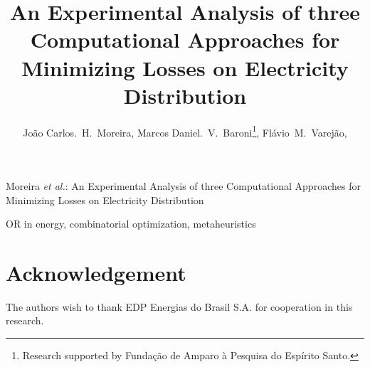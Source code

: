 \documentclass{IEEEtran}
\begin{document}
\title{An Experimental Analysis of three Computational Approaches for Minimizing Losses on Electricity Distribution}

\author{Jo\~ao Carlos.~H.~Moreira,
	Marcos Daniel.~V.~Baroni\thanks{Research supported by Funda\c c\~ao de Amparo \`a Pesquisa do Esp\'irito Santo.},
	Fl\'avio~M.~Varej\~ao,
}

%
{Moreira \MakeLowercase{\textit{et al.}}: An Experimental Analysis of three Computational Approaches for Minimizing Losses on Electricity Distribution}

\maketitle

\begin{abstract}

\end{abstract}

\begin{IEEEkeywords}
OR in energy, combinatorial optimization, metaheuristics
\end{IEEEkeywords}

\IEEEpeerreviewmaketitle









\section*{Acknowledgement}
The authors wish to thank EDP Energias do Brasil S.A. for cooperation in this research.

\ifCLASSOPTIONcaptionsoff
  \newpage
\fi





\end{document}
